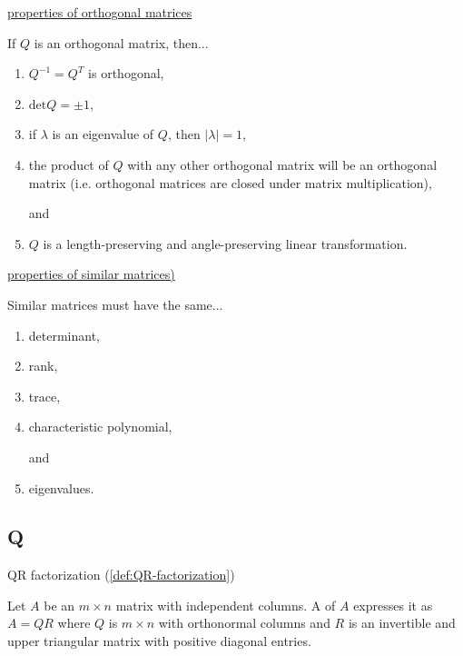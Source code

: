 \documentclass{ximera}
\begin{document}
\href{https://ximera.osu.edu/linearalgebradzv3/LinearAlgebraInteractiveIntro/RTH-0035/main}{properties of orthogonal matrices}
\begin{expandable}{}{}
If $Q$ is an orthogonal matrix, then...
\begin{enumerate}
    \item $Q^{-1} = Q^T$ is orthogonal,

    \item $\mbox{det} Q = \pm 1$,

    \item if $\lambda$ is an eigenvalue of $Q$, then $|\lambda|=1$,

    \item the product of $Q$ with any other orthogonal matrix will be an orthogonal matrix (i.e. orthogonal matrices are closed under matrix multiplication), 

    and

    \item $Q$ is a length-preserving and angle-preserving linear transformation.

\end{enumerate}
\end{expandable}

\href{https://ximera.osu.edu/linearalgebradzv3/LinearAlgebraInteractiveIntro/EIG-0040/main}{properties of similar matrices)}
\begin{expandable}{}{}
Similar matrices must have the same...
\begin{enumerate}
    \item determinant,

    \item rank,

    \item trace,

    \item characteristic polynomial, 

    and

    \item eigenvalues.

\end{enumerate}
\end{expandable}

\subsection*{Q}

QR factorization (\ref{def:QR-factorization})
\begin{expandable}{}{}
    Let $A$ be an $m \times n$ matrix with independent columns. A  of $A$ expresses it as $A = QR$ where $Q$ is $m \times n$ with orthonormal columns and $R$ is an invertible and upper triangular matrix with positive diagonal entries.
\end{expandable}
\end{document}
